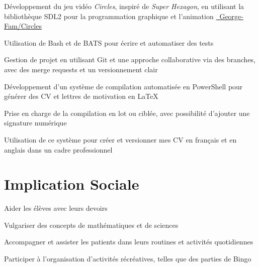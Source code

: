\documentclass[letterpaper,10pt]{article}
\begin{document}
  \begin{resume_list}
    \item Développement du jeu vidéo \textit{Circles}, inspiré de \textit{Super Hexagon}, en utilisant la bibliothèque SDL2 pour la programmation graphique et l’animation {\small \href{https://github.com/George-Fam/Circles}{\faGithubSquare\ George-Fam/Circles}}
    \vspace{2pt}
    \item Utilisation de Bash et de BATS pour écrire et automatiser des tests
    \vspace{2pt}
    \item Gestion de projet en utilisant Git et une approche collaborative via des branches, avec des merge requests et un versionnement clair
  \end{resume_list}
  
  \begin{resume_list}
  \item Développement d’un système de compilation automatisée en PowerShell pour générer des CV et lettres de motivation en LaTeX 
  \item Prise en charge de la compilation en lot ou ciblée, avec possibilité d’ajouter une signature numérique
  \item Utilisation de ce système pour créer et versionner mes CV en français et en anglais dans un cadre professionnel
  \end{resume_list}


  \section{Implication Sociale}

  \begin{resume_list}
    \item Aider les élèves avec leurs devoirs
    \item Vulgariser des concepts de mathématiques et de sciences
  \end{resume_list}
  
\begin{resume_list}
    \item Accompagner et assister les patients dans leurs routines et activités quotidiennes
    \item Participer à l'organisation d'activités récréatives, telles que des parties de Bingo
\end{resume_list}
\end{document}
